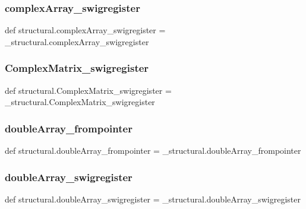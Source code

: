\subsubsection{\texorpdfstring{complex\+Array\+\_\+swigregister}{complexArray\_swigregister}}
{\footnotesize\ttfamily def structural.\+complex\+Array\+\_\+swigregister = \+\_\+structural.\+complex\+Array\+\_\+swigregister}

\mbox{\label{namespacestructural_a004655d11c57ba0006c07cf4980f296f}} 
\subsubsection{\texorpdfstring{Complex\+Matrix\+\_\+swigregister}{ComplexMatrix\_swigregister}}
{\footnotesize\ttfamily def structural.\+Complex\+Matrix\+\_\+swigregister = \+\_\+structural.\+Complex\+Matrix\+\_\+swigregister}

\mbox{\label{namespacestructural_a0f6818d3470f65d04dc0700127d4b978}} 
\subsubsection{\texorpdfstring{double\+Array\+\_\+frompointer}{doubleArray\_frompointer}}
{\footnotesize\ttfamily def structural.\+double\+Array\+\_\+frompointer = \+\_\+structural.\+double\+Array\+\_\+frompointer}

\mbox{\label{namespacestructural_a241f62a8e948519ab424201f4b7d7d5b}} 
\subsubsection{\texorpdfstring{double\+Array\+\_\+swigregister}{doubleArray\_swigregister}}
{\footnotesize\ttfamily def structural.\+double\+Array\+\_\+swigregister = \+\_\+structural.\+double\+Array\+\_\+swigregister}

